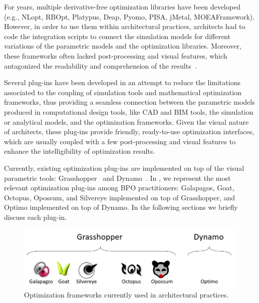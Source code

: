 For years, multiple derivative-free optimization libraries have been developed (e.g., NLopt, RBOpt, Platypus, Deap, Pyomo, PISA, jMetal, MOEAFramework). However, in order to use them within architectural practices, architects had to code the integration scripts to connect the simulation models for different variations of the parametric models and the optimization libraries\cite{Attia2013}. Moreover, these frameworks often lacked post-processing and visual features, which antagonized the readability and comprehension of the results~\cite{Attia2013,Nguyen2014}.
	
Several plug-ins have been developed in an attempt to reduce the limitations associated to the coupling of simulation tools and mathematical optimization frameworks, thus providing a seamless connection between the parametric models produced in computational design tools, like \ac{CAD} and \ac{BIM} tools, the simulation or analytical models, and the optimization frameworks. Given the visual nature of architects, these plug-ins provide friendly, ready-to-use optimization interfaces, which are usually coupled with a few post-processing and visual features to enhance the intelligibility of optimization results. 
	
Currently, existing optimization plug-ins are implemented on top of the visual parametric tools: Grasshopper~\cite{GRASSHOPPER} and Dynamo~\cite{DYNAMOBIM}. In , we represent the most relevant optimization plug-ins among \ac{BPO} practitioners: Galapagos, Goat, Octopus, Opossum, and Silvereye implemented on top of Grasshopper, and Optimo implemented on top of Dynamo. In the following sections we briefly discuss each plug-in.
	
\begin{figure}
\centering
\includegraphics[width=\textwidth]{Images/Background/opt-plugins.PNG}
\caption[Optimization Frameworks in the Architectural Practice]{Optimization frameworks currently used in architectural practices.}
\label{fig:opt-plugins}
\end{figure}

